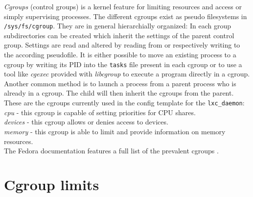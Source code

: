 \textit{Cgroups} (control groups) is a kernel feature for limiting resources and access or simply supervising processes. The different cgroups exist as
pseudo filesystems in \texttt{/sys/fs/cgroup}. They are in general hierarchially organized: In each group subdirectories can be created
which inherit the settings of the parent control group. Settings are read and altered by reading from or respectively writing to the according
pseudofile. It is either possible to move an existing process to a cgroup by writing its PID into the \texttt{tasks} file present in each cgroup
or to use a tool like \textit{cgexec} provided with \textit{libcgroup}\cite{libcgroup} to execute a program directly in a cgroup.
Another common method is to launch a process from a parent process who is already in a cgroup. The child will then inherit the cgroups
from the parent.\\
These are the cgroups currently used in the config template for the \texttt{lxc\_daemon}:\\
\textit{cpu} - this cgroup is capable of setting priorities for CPU shares.\\
\textit{devices} - this cgroup allows or denies access to devices. \\
\textit{memory} - this cgroup is able to limit and provide information on memory resources.\\
The Fedora documentation features a full list of the prevalent cgroups \cite{cgroups}.

\section{Cgroup limits}

